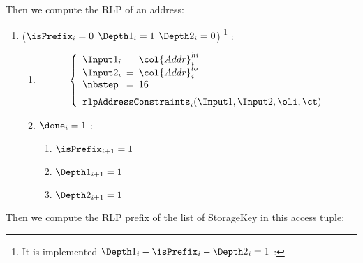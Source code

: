 Then we compute the RLP of an address:
\begin{enumerate}[resume]
	\item \If ($\isPrefix_{i}=0$ \et $\Depth1_{i}=1$ \et $\Depth2_{i}=0$) \footnote{It is implemented \If  $\Depth1_{i} - \isPrefix_{i} - \Depth2_{i}=1$ \Then:} \Then:
		\begin{enumerate}
			\item
				\[
					\left\{
						\begin{array}{lcl}
							\Input1_{i} & \!\!\! = \!\!\! & \col{Addr}^{hi}_{i} \\
							\Input2_{i} & \!\!\! = \!\!\! & \col{Addr}^{lo}_{i} \\
							\nbstep & \!\!\! = \!\!\! & 16 \vspace{2mm} \\
							\multicolumn{3}{l}{\texttt{rlpAddressConstraints}_{i}(\Input1, \Input2, \oli, \ct)} \\
						\end{array}
						\right.
					\]
				\item \If $\done_{i}=1$ \Then:
					\begin{enumerate}
						\item $\isPrefix_{i+1}=1$
						\item $\Depth1_{i+1}=1$
						\item $\Depth2_{i+1}=1$
					\end{enumerate}
		\end{enumerate}
\end{enumerate}
Then we compute the RLP prefix of the list of StorageKey in this access tuple:
